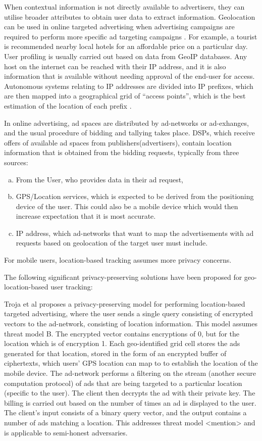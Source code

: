 \documentclass[sigconf,nonacm]{acmart}
\begin{document}
When contextual information is not directly available to advertisers, they can utilise broader attributes to obtain user data to extract information. Geolocation can be used in online targeted advertising when advertising campaigns are required to perform more specific ad targeting campaigns \cite{ipgeolocation}. For example, a tourist is recommended nearby local hotels for an affordable price on a particular day. User profiling is usually carried out based on data from GeoIP databases. Any host on the internet can be reached with their IP address, and it is also information that is available without needing approval of the end-user for access. Autonomous systems relating to IP addresses are divided into IP prefixes, which are then mapped into a geographical grid of “access points”, which is the best estimation of the location of each prefix \cite{ipgeolocation}.

In online advertising, ad spaces are distributed by ad-networks or ad-exhanges, and the usual procedure of bidding and tallying takes place. DSPs, which receive offers of available ad spaces from publishers(advertisers), contain location information that is obtained from the bidding requests, typically from three sources:
\begin{enumerate}[a.]
    \item From the User, who provides data in their ad request,
    \item GPS/Location services, which is expected to be derived from the positioning device of the user. This could also be a mobile device which would then increase expectation that it is most accurate. 
    \item IP address, which ad-networks that want to map the advertisements with ad requests based on geolocation of the target user must include. 
\end{enumerate}

 For mobile users, location-based tracking assumes more privacy concerns. 
 
 The following significant privacy-preserving solutions have been proposed for geo-location-based user tracking:
 
 Troja et al \cite{location} proposes a privacy-preserving model for performing location-based targeted advertising, where the user sends a single query consisting of encrypted vectors to the ad-network, consisting of location information. This model assumes threat model B. The encrypted vector contains encryptions of 0, but for the location which is of encryption 1. Each geo-identified grid cell stores the ads generated for that location, stored in the form of an encrypted buffer of ciphertexts, which users’ GPS location can map to to establish the location of the mobile device. The ad-network performs a filtering on the stream (another secure computation protocol) of ads that are being targeted to a particular location (specific to the user). The client then decrypts the ad with their private key. The billing is carried out based on the number of times an ad is displayed to the user. The client’s input consists of a binary query vector, and the output contains a number of ads matching a location. This addresses threat model <mention> and is applicable to semi-honest adversaries. 
 
\end{document}

